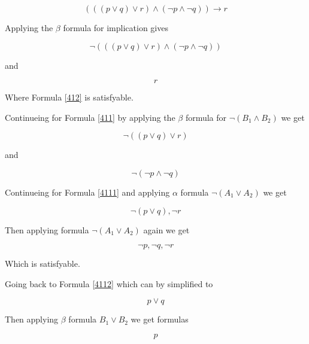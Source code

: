 \documentclass[10pt,a4paper]{article}
\begin{document}
\begin{equation}
\label{41}
 ((( p \vee q) \vee r ) \wedge ( \neg p \wedge \neg q )) \rightarrow r
\end{equation}

Applying the $\beta$ formula for implication gives

\begin{equation}
\label{411}
 \neg  ((( p \vee q) \vee r ) \wedge ( \neg p \wedge \neg q ))
\end{equation}

and

\begin{equation}
\label{412}
 r
\end{equation}

Where Formula \ref{412} is satisfyable.

Continueing for Formula \ref{411} by applying the $\beta$ formula for $\neg (B_1 \wedge B_2)$ we get



 \begin{equation}
 \label{4111}
  \neg (( p \vee q ) \vee r )
 \end{equation}

 and 
 
 \begin{equation}
 \label{4112}
  \neg ( \neg p \wedge \neg q )
 \end{equation}


Continueing for Formula \ref{4111} and applying $\alpha$ formula $\neg ( A_1 \vee A_2 )$ we get

\begin{equation}
\label{41111}
 \neg (p \vee q), \neg r 
\end{equation}

Then applying formula $\neg ( A_1 \vee A_2 )$ again we get

\begin{equation}
\label{411111}
 \neg p, \neg q, \neg r
\end{equation}

Which is satisfyable.

Going back to Formula \ref{4112} which can by simplified to 

\begin{equation}
 p \vee q
\end{equation}

Then applying $\beta$ formula $B_1 \vee B_2$ we get formulas

\begin{equation}
 \label{41121}
 p
\end{equation}
\end{document}
